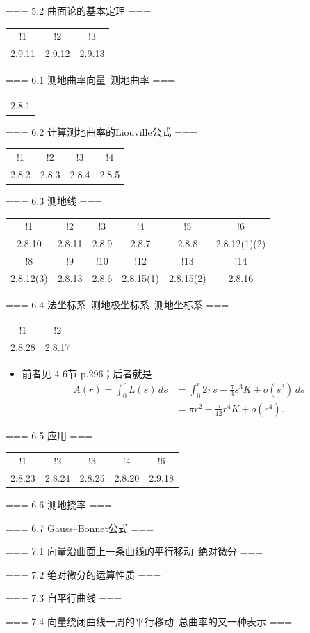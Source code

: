 === 5.2 曲面论的基本定理 ===
\begin{tabular}{ccc}!1&!2&!3\\2.9.11&2.9.12&2.9.13\end{tabular}

=== 6.1 测地曲率向量\ 测地曲率 ===
\begin{tabular}{c}2.8.1\end{tabular}

=== 6.2 计算测地曲率的Liouville公式 ===
\begin{tabular}{cccc}
    !1&!2&!3&!4\\2.8.2&2.8.3&2.8.4&2.8.5
\end{tabular}

=== 6.3 测地线 ===
\begin{tabular}{cccccc}
    !1&!2&!3&!4&!5&!6\\2.8.10&2.8.11&2.8.9&2.8.7&2.8.8&2.8.12(1)(2)\\
    !8&!9&!10&!12&!13&!14\\2.8.12(3)&2.8.13&2.8.6&2.8.15(1)&2.8.15(2)&2.8.16
\end{tabular}

=== 6.4 法坐标系\ 测地极坐标系\ 测地坐标系 ===
\begin{tabular}{cc}!1&!2\\2.8.28&2.8.17\end{tabular}
\begin{itemize}
    \item[1.] 前者见\cite{dC} 4-6节 p.296；后者就是
    \begin{align*}
        A(r)=\int_0^rL(s)\,ds&=\int_0^r2\pi s-\frac{\pi}{3}s^3K+o(s^3)\,ds\\
        &=\pi r^2-\frac{\pi}{12}r^4K+o(r^4).
    \end{align*}
\end{itemize}

=== 6.5 应用 ===
\begin{tabular}{ccccc}
    !1&!2&!3&!4&!6\\2.8.23&2.8.24&2.8.25&2.8.20&2.9.18
\end{tabular}

=== 6.6 测地挠率 ===

=== 6.7 Gauss--Bonnet公式 ===

=== 7.1 向量沿曲面上一条曲线的平行移动\ 绝对微分 ===

=== 7.2 绝对微分的运算性质 ===

=== 7.3 自平行曲线 ===

=== 7.4 向量绕闭曲线一周的平行移动\ 总曲率的又一种表示 ===

